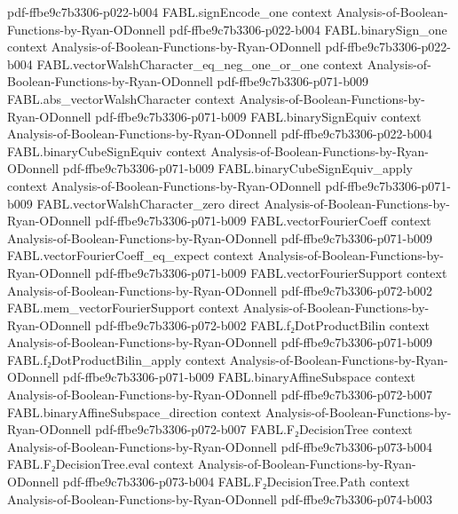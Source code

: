 \begin{theorem}
  {pdf-ffbe9c7b3306-p022-b004}
\proofstep
  {FABL.signEncode_one}
  {context}
  {Analysis-of-Boolean-Functions-by-Ryan-ODonnell}
  {pdf-ffbe9c7b3306-p022-b004}
\proofstep
  {FABL.binarySign_one}
  {context}
  {Analysis-of-Boolean-Functions-by-Ryan-ODonnell}
  {pdf-ffbe9c7b3306-p022-b004}
\proofstep
  {FABL.vectorWalshCharacter_eq_neg_one_or_one}
  {context}
  {Analysis-of-Boolean-Functions-by-Ryan-ODonnell}
  {pdf-ffbe9c7b3306-p071-b009}
\proofstep
  {FABL.abs_vectorWalshCharacter}
  {context}
  {Analysis-of-Boolean-Functions-by-Ryan-ODonnell}
  {pdf-ffbe9c7b3306-p071-b009}
\proofstep
  {FABL.binarySignEquiv}
  {context}
  {Analysis-of-Boolean-Functions-by-Ryan-ODonnell}
  {pdf-ffbe9c7b3306-p022-b004}
\proofstep
  {FABL.binaryCubeSignEquiv}
  {context}
  {Analysis-of-Boolean-Functions-by-Ryan-ODonnell}
  {pdf-ffbe9c7b3306-p071-b009}
\proofstep
  {FABL.binaryCubeSignEquiv_apply}
  {context}
  {Analysis-of-Boolean-Functions-by-Ryan-ODonnell}
  {pdf-ffbe9c7b3306-p071-b009}
\proofstep
  {FABL.vectorWalshCharacter_zero}
  {direct}
  {Analysis-of-Boolean-Functions-by-Ryan-ODonnell}
  {pdf-ffbe9c7b3306-p071-b009}
\proofstep
  {FABL.vectorFourierCoeff}
  {context}
  {Analysis-of-Boolean-Functions-by-Ryan-ODonnell}
  {pdf-ffbe9c7b3306-p071-b009}
\proofstep
  {FABL.vectorFourierCoeff_eq_expect}
  {context}
  {Analysis-of-Boolean-Functions-by-Ryan-ODonnell}
  {pdf-ffbe9c7b3306-p071-b009}
\proofstep
  {FABL.vectorFourierSupport}
  {context}
  {Analysis-of-Boolean-Functions-by-Ryan-ODonnell}
  {pdf-ffbe9c7b3306-p072-b002}
\proofstep
  {FABL.mem_vectorFourierSupport}
  {context}
  {Analysis-of-Boolean-Functions-by-Ryan-ODonnell}
  {pdf-ffbe9c7b3306-p072-b002}
\proofstep
  {FABL.f₂DotProductBilin}
  {context}
  {Analysis-of-Boolean-Functions-by-Ryan-ODonnell}
  {pdf-ffbe9c7b3306-p071-b009}
\proofstep
  {FABL.f₂DotProductBilin_apply}
  {context}
  {Analysis-of-Boolean-Functions-by-Ryan-ODonnell}
  {pdf-ffbe9c7b3306-p071-b009}
\proofstep
  {FABL.binaryAffineSubspace}
  {context}
  {Analysis-of-Boolean-Functions-by-Ryan-ODonnell}
  {pdf-ffbe9c7b3306-p072-b007}
\proofstep
  {FABL.binaryAffineSubspace_direction}
  {context}
  {Analysis-of-Boolean-Functions-by-Ryan-ODonnell}
  {pdf-ffbe9c7b3306-p072-b007}
\proofstep
  {FABL.F₂DecisionTree}
  {context}
  {Analysis-of-Boolean-Functions-by-Ryan-ODonnell}
  {pdf-ffbe9c7b3306-p073-b004}
\proofstep
  {FABL.F₂DecisionTree.eval}
  {context}
  {Analysis-of-Boolean-Functions-by-Ryan-ODonnell}
  {pdf-ffbe9c7b3306-p073-b004}
\proofstep
  {FABL.F₂DecisionTree.Path}
  {context}
  {Analysis-of-Boolean-Functions-by-Ryan-ODonnell}
  {pdf-ffbe9c7b3306-p074-b003}

\end{theorem}
